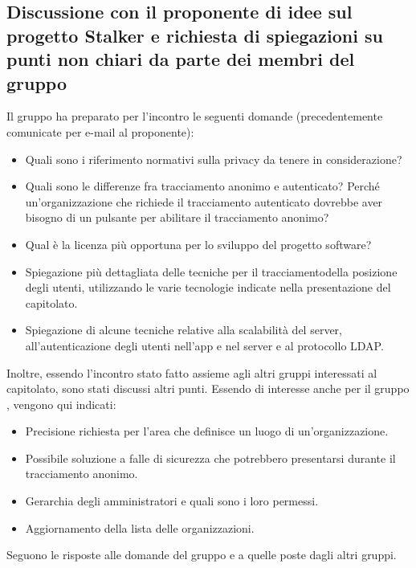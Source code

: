 \subsection{Discussione con il proponente di idee sul progetto Stalker e richiesta di spiegazioni su punti non chiari da parte dei membri del gruppo}
Il gruppo ha preparato per l'incontro le seguenti domande (precedentemente comunicate per e-mail al proponente):
\begin{itemize}
	\item Quali sono i riferimento normativi sulla privacy da tenere in considerazione?
	\item Quali sono le differenze fra tracciamento anonimo e autenticato? Perché un'organizzazione che richiede il tracciamento autenticato dovrebbe aver bisogno di un pulsante per abilitare il tracciamento anonimo?
	\item Qual è la licenza più opportuna per lo sviluppo del progetto software?
	\item Spiegazione più dettagliata delle tecniche per il tracciamentodella posizione degli utenti, utilizzando le varie tecnologie indicate nella presentazione del capitolato.
	\item Spiegazione di alcune tecniche relative alla scalabilità del server, all'autenticazione degli utenti nell'app e nel server e al protocollo LDAP.
\end{itemize}
Inoltre, essendo l'incontro stato fatto assieme agli altri gruppi interessati al capitolato, sono stati discussi altri punti. Essendo di interesse anche per il gruppo \Gruppo{}, vengono qui indicati:
\begin{itemize}
	\item Precisione richiesta per l'area che definisce un luogo di un'organizzazione.
	\item Possibile soluzione a falle di sicurezza che potrebbero presentarsi durante il tracciamento anonimo.
	\item Gerarchia degli amministratori e quali sono i loro permessi.
	\item Aggiornamento della lista delle organizzazioni.
\end{itemize}
Seguono le risposte alle domande del gruppo e a quelle poste dagli altri gruppi.

